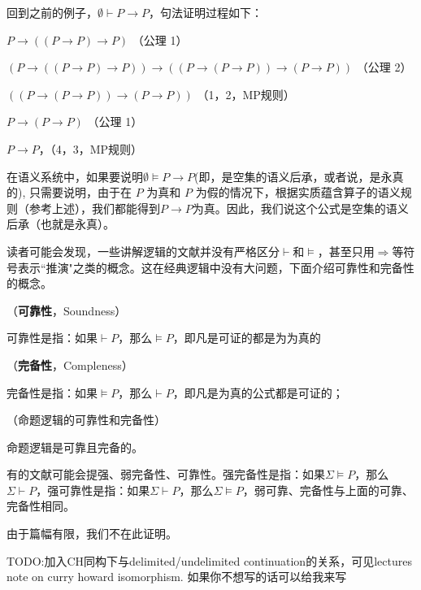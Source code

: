 回到之前的例子，$\emptyset \vdash P \to P$，句法证明过程如下：
\begin{tightenum}
 \item $ P \to ((P \to P) \to P)$ （公理 1）
 \item $(P \to ((P \to P) \to P)) \to ((P \to (P \to P)) \to (P \to P))$ （公理 2）
 \item $((P \to (P \to P)) \to (P \to P))$ （1，2，MP规则）
 \item  $P \to (P \to P)$ （公理 1）
 \item  $P \to P$，（4，3，MP规则）
\end{tightenum}

在语义系统中，如果要说明$\emptyset \models P \to P$(即，是空集的语义后承，或者说，是永真的),
只需要说明，由于在 $P$ 为真和 $P$ 为假的情况下，根据实质蕴含算子的语义规则（参考上述），我们都能得到$P \to P$为真。因此，我们说这个公式是空集的语义后承（也就是永真）。


读者可能会发现，一些讲解逻辑的文献并没有严格区分$\vdash$和$\models$，甚至只用$\Rightarrow$等符号表示``推演"之类的概念。这在经典逻辑中没有大问题，下面介绍可靠性和完备性的概念。


\begin{defn}（\textbf{可靠性}，Soundness）

可靠性是指：如果$\vdash P$，那么$\models P$，即凡是可证的都是为为真的

\end{defn}



\begin{defn}（\textbf{完备性}，Compleness）

完备性是指：如果$\models P$，那么$\vdash P$，即凡是为真的公式都是可证的；

\end{defn}


\begin{thm}（命题逻辑的可靠性和完备性）

命题逻辑是可靠且完备的。
\end{thm}

\begin{rem}

有的文献可能会提强、弱完备性、可靠性。强完备性是指：如果$\Sigma \models P$，那么$\Sigma \vdash P$，强可靠性是指：如果$\Sigma \vdash P$，那么$\Sigma \models P$，弱可靠、完备性与上面的可靠、完备性相同。
\end{rem}


由于篇幅有限，我们不在此证明。


TODO:加入CH同构下与delimited/undelimited continuation的关系，可见lectures note on curry howard isomorphism. 如果你不想写的话可以给我来写
